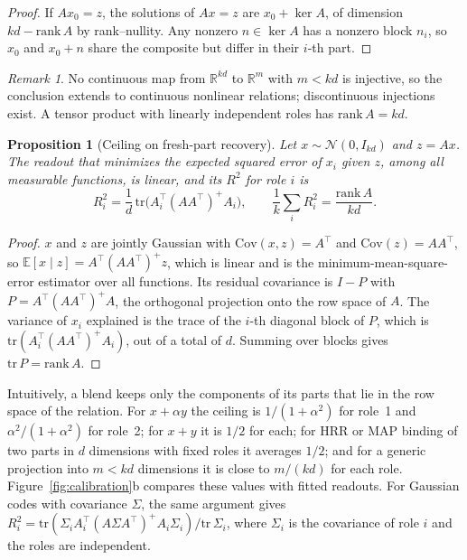 \documentclass[10pt]{article}
\theoremstyle{plain}
\newtheorem{proposition}{Proposition}
\theoremstyle{remark}
\newtheorem*{remark}{Remark}
\newcommand{\R}{\mathbb{R}}
\begin{document}
\begin{proof}
If $Ax_0 = z$, the solutions of $Ax = z$ are $x_0 + \ker A$, of dimension $kd - \mathrm{rank}\,A$ by rank--nullity. Any nonzero $n \in \ker A$ has a nonzero block $n_i$, so $x_0$ and $x_0 + n$ share the composite but differ in their $i$-th part.
\end{proof}

\begin{remark}
No continuous map from $\R^{kd}$ to $\R^m$ with $m < kd$ is injective, so the conclusion extends to continuous nonlinear relations; discontinuous injections exist. A tensor product with linearly independent roles has $\mathrm{rank}\,A = kd$.
\end{remark}

\begin{proposition}[Ceiling on fresh-part recovery]
\label{prop:ceiling}
Let $x \sim \mathcal{N}(0, I_{kd})$ and $z = Ax$. The readout that minimizes the expected squared error of $x_i$ given $z$, among all measurable functions, is linear, and its $R^2$ for role $i$ is
\begin{equation}
  R^2_i = \frac{1}{d}\,\mathrm{tr}\big(A_i^{\top} (A A^{\top})^{+} A_i\big), \qquad \frac{1}{k}\sum_i R^2_i = \frac{\mathrm{rank}\,A}{kd}.
\end{equation}
\end{proposition}

\begin{proof}
$x$ and $z$ are jointly Gaussian with $\mathrm{Cov}(x, z) = A^{\top}$ and $\mathrm{Cov}(z) = AA^{\top}$, so $\mathbb{E}[x \mid z] = A^{\top}(AA^{\top})^{+}z$, which is linear and is the minimum-mean-square-error estimator over all functions. Its residual covariance is $I - P$ with $P = A^{\top}(AA^{\top})^{+}A$, the orthogonal projection onto the row space of $A$. The variance of $x_i$ explained is the trace of the $i$-th diagonal block of $P$, which is $\mathrm{tr}(A_i^{\top}(AA^{\top})^{+}A_i)$, out of a total of $d$. Summing over blocks gives $\mathrm{tr}\,P = \mathrm{rank}\,A$.
\end{proof}

\noindent
Intuitively, a blend keeps only the components of its parts that lie in the row space of the relation. For $x + \alpha y$ the ceiling is $1/(1 + \alpha^2)$ for role~1 and $\alpha^2/(1 + \alpha^2)$ for role~2; for $x + y$ it is $1/2$ for each; for HRR or MAP binding of two parts in $d$ dimensions with fixed roles it averages $1/2$; and for a generic projection into $m < kd$ dimensions it is close to $m/(kd)$ for each role. Figure~\ref{fig:calibration}b compares these values with fitted readouts. For Gaussian codes with covariance $\Sigma$, the same argument gives $R^2_i = \mathrm{tr}(\Sigma_i A_i^{\top}(A\Sigma A^{\top})^{+}A_i\Sigma_i)/\mathrm{tr}\,\Sigma_i$, where $\Sigma_i$ is the covariance of role $i$ and the roles are independent.
\end{document}
